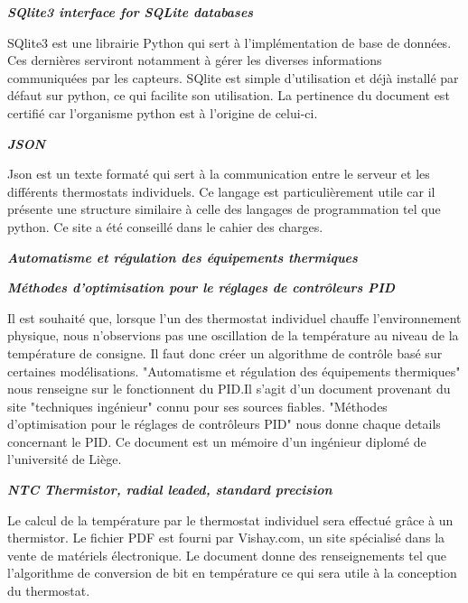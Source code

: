 \documentclass[12pt]{report}
\begin{document}
\textbf{\textit{SQlite3 interface for SQLite databases}}\cite{_11.13._????}

SQlite3 est une librairie Python qui sert \`{a} l'impl\'{e}mentation de base de donn\'{e}es.
Ces derni\`{e}res serviront notamment à g\'{e}rer les diverses informations communiqu\'{e}es par les capteurs.
SQlite est simple d'utilisation et d\'{e}j\`{a} install\'{e} par d\'{e}faut sur python, ce qui facilite son utilisation.
La pertinence du document est certifié car l'organisme python est à l'origine de celui-ci.


\vspace*{1cm}
\textbf{\textit{JSON}} \cite{_json_????}

Json est un texte format\'{e} qui sert \`{a} la communication entre le serveur et les diff\'{e}rents thermostats individuels.
Ce langage est particuli\`{e}rement utile car il pr\'{e}sente une structure similaire \`{a} celle des langages de programmation tel que python.
Ce site a \'{e}t\'{e} conseill\'{e} dans le cahier des charges.
\vspace*{1cm}

\textbf{\textit{Automatisme et r\'{e}gulation des \'{e}quipements thermiques}} \cite{bourgeois_automatisme_2015}

\textbf{\textit{M\'{e}thodes d'optimisation pour le r\'{e}glages de contr\^{o}leurs PID}} \cite{de_geest_emmanuel_methodes_????}

Il est souhait\'{e} que, lorsque l'un des thermostat individuel chauffe l'environnement physique, nous n'observions pas une oscillation de la temp\'{e}rature au niveau de la temp\'{e}rature de consigne. Il faut donc cr\'{e}er un algorithme de contr\^{o}le bas\'{e} sur certaines mod\'{e}lisations.
"Automatisme et r\'{e}gulation des \'{e}quipements thermiques" nous renseigne sur le fonctionnent du PID.Il s'agit d'un document provenant du site "techniques ing\'{e}nieur" connu pour ses sources fiables. "M\'{e}thodes d'optimisation pour le r\'{e}glages de contr\^{o}leurs PID" nous donne chaque details concernant le PID. Ce document est un m\'{e}moire d'un ing\'{e}nieur diplom\'{e} de l'universit\'{e} de Li\`{e}ge.
\vspace*{1cm}


\textbf{\textit{NTC Thermistor, radial leaded, standard precision}} \cite{100.pdf_????}

Le calcul de la temp\'{e}rature par le thermostat individuel sera effectu\'{e} gr\^{a}ce \`{a} un thermistor. Le fichier PDF est fourni par Vishay.com, un site sp\'{e}cialis\'{e} dans la vente de mat\'{e}riels \'{e}lectronique. Le document donne des renseignements tel que l'algorithme de conversion de bit en temp\'{e}rature ce qui sera utile \`{a} la conception du thermostat.
\end{document}
